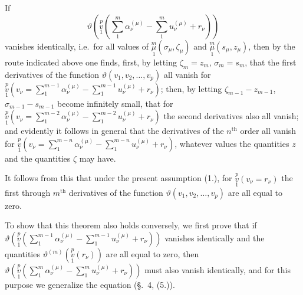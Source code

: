 \documentclass{article}
\begin{document}
If
\[
\tag{(1.)}
\vartheta\left(\overset{p}{\underset{1}{v}}\left(\sum_1^m \alpha_\nu^{(\mu)} - \sum_1^m u_\nu^{(\mu)} + r_\nu\right)\right)
\]
vanishes identically, i.e.\ for all values of $\overset{m}{\underset{1}{\mu}}(\sigma_\mu, \zeta_\mu)$ and $\overset{m}{\underset{1}{\mu}}(s_\mu, z_\mu)$, then by the route indicated above one finds, first, by letting $\zeta_m = z_m$, $\sigma_m = s_m$, that the first derivatives of the function $\vartheta(v_1, v_2, \dots, v_p)$ all vanish for $\overset{p}{\underset{1}{v}}\left(v_\nu = \displaystyle\sum_1^{m-1} \alpha_\nu^{(\mu)} - \displaystyle\sum_1^{m-1} u_\nu^{(\mu)} + r_\nu\right)$; then, by letting $\zeta_{m-1} - z_{m-1}$, $\sigma_{m-1} - s_{m-1}$ become infinitely small, that for $\overset{p}{\underset{1}{v}}\left(v_\nu = \displaystyle\sum_1^{m-2} \alpha_\nu^{(\mu)} - \displaystyle\sum_1^{m-2} u_\nu^{(\mu)} + r_\nu\right)$ the second derivatives also all vanish; and evidently it follows in general that the derivatives of the $n^{\text{th}}$ order all vanish for $\overset{p}{\underset{1}{v}}\left(v_\nu = \displaystyle\sum_1^{m-n} \alpha_\nu^{(\mu)} - \displaystyle\sum_1^{m-n} u_\nu^{(\mu)} + r_\nu\right)$, whatever values the quantities $z$ and the quantities $\zeta$ may have.

It follows from this that under the present assumption (1.), for $\overset{p}{\underset{1}{v}}(v_\nu = r_\nu)$ the first through $m^{\text{th}}$ derivatives of the function $\vartheta(v_1, v_2, \dots, v_p)$ are all equal to zero.

To show that this theorem also holds conversely, we first prove that if $\vartheta\left(\overset{p}{\underset{1}{v}}\left(\displaystyle\sum_1^{m-1} \alpha_\nu^{(\mu)} - \displaystyle\sum_1^{m-1} u_\nu^{(\mu)} + r_\nu\right)\right)$ vanishes identically and the quantities $\vartheta^{(m)}\left(\overset{p}{\underset{1}{v}}(r_\nu)\right)$ are all equal to zero, then $\vartheta\left(\overset{p}{\underset{1}{v}}\left(\displaystyle\sum_1^m \alpha_\nu^{(\mu)} - \displaystyle\sum_1^m u_\nu^{(\mu)} + r_\nu\right)\right)$ must also vanish identically, and for this purpose we generalize the equation (\S.~4, (5.)).
\end{document}
